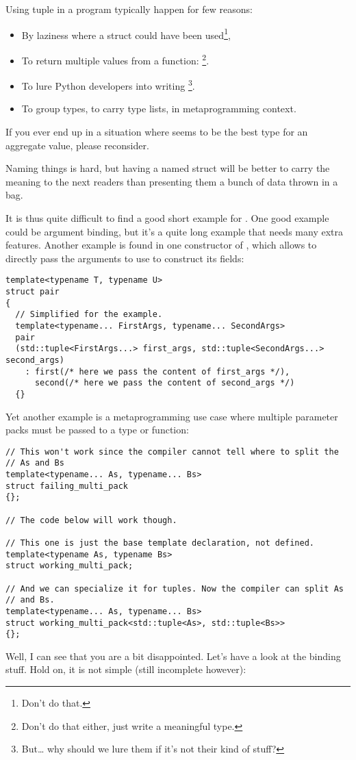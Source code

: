 Using tuple in a \cpp{} program typically happen for few reasons:
\begin{itemize}
\item By laziness where a struct could have been used\footnote{Don't
  do that.},
\item To return multiple values from a function:
  \footnote{Don't do
    that either, just write a meaningful type.}.
\item To lure Python developers into writing \cpp{}\footnote{But… why
  should we lure them if it's not their kind of stuff?}.
\item To group types, to carry type lists, in metaprogramming context.
\end{itemize}

\begin{guideline}
If you ever end up in a situation where  seems to be
the best type for an aggregate value, please reconsider.

Naming things is hard, but having a named struct will be better to
carry the meaning to the next readers than presenting them a bunch of
data thrown in a bag.
\end{guideline}

It is thus quite difficult to find a good short example for
. One good example could be argument binding, but
it's a quite long example that needs many extra features. Another
example is found in one constructor of , which allows
to directly pass the arguments to use to construct its fields:

\begin{lstlisting}
template<typename T, typename U>
struct pair
{
  // Simplified for the example.
  template<typename... FirstArgs, typename... SecondArgs>
  pair
  (std::tuple<FirstArgs...> first_args, std::tuple<SecondArgs...> second_args)
    : first(/* here we pass the content of first_args */),
      second(/* here we pass the content of second_args */)
  {}
\end{lstlisting}

Yet another example is a metaprogramming use case where multiple
parameter packs must be passed to a type or function:

\begin{lstlisting}
// This won't work since the compiler cannot tell where to split the
// As and Bs
template<typename... As, typename... Bs>
struct failing_multi_pack
{};

// The code below will work though.

// This one is just the base template declaration, not defined.
template<typename As, typename Bs>
struct working_multi_pack;

// And we can specialize it for tuples. Now the compiler can split As
// and Bs.
template<typename... As, typename... Bs>
struct working_multi_pack<std::tuple<As>, std::tuple<Bs>>
{};
\end{lstlisting}

Well, I can see that you are a bit disappointed. Let's have a look at
the binding stuff. Hold on, it is not simple (still incomplete however):


